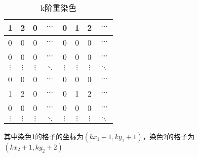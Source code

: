 \begin{table}[h]
	\centering
	\caption{k阶重染色}
	\begin{tabular}{|c|c|c|c|c|c|c|c|}
		\hline
		1        & 2        & 0        & $\cdots$ & 0        & 1        & 2        & $\cdots$ \\
		\hline
		0        & 0        & 0        & $\cdots$ & 0        & 0        & 0        & $\cdots$ \\
		\hline
		0        & 0        & 0        & $\cdots$ & 0        & 0        & 0        & $\cdots$ \\
		\hline
		$\vdots$ & $\vdots$ & $\vdots$ & $\ddots$ & $\vdots$ & $\vdots$ & $\vdots$ & $\ddots$ \\
		\hline
		0        & 0        & 0        & $\cdots$ & 0        & 0        & 0        & $\cdots$ \\
		\hline
		1        & 2        & 0        & $\cdots$ & 0        & 1        & 2        & $\cdots$ \\
		\hline
		0        & 0        & 0        & $\cdots$ & 0        & 0        & 0        & $\cdots$ \\
		\hline
		$\vdots$ & $\vdots$ & $\vdots$ & $\ddots$ & $\vdots$ & $\vdots$ & $\vdots$ & $\ddots$ \\
		\hline
	\end{tabular}
	\label{fig:k-order-staining-last}
\end{table}

其中染色1的格子的坐标为$(kx_1 + 1, ky_1 + 1)$，染色2的格子为$(kx_2 + 1, ky_2 + 2)$ 